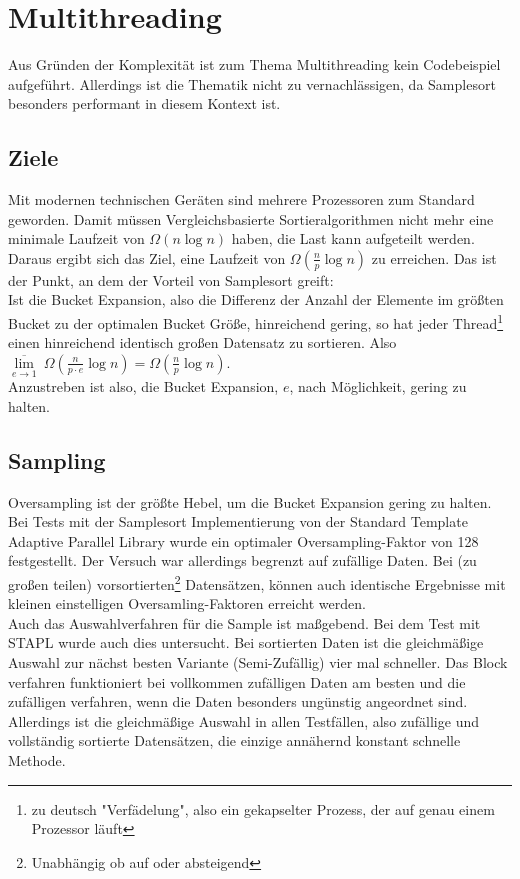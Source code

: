 \section{Multithreading}\label{sec:multithreading}
	Aus Gründen der Komplexität ist zum Thema Multithreading kein Codebeispiel aufgeführt.
	Allerdings ist die Thematik nicht zu vernachlässigen, da Samplesort besonders performant in diesem Kontext ist.
	
	\subsection{Ziele}
		Mit modernen technischen Geräten sind mehrere Prozessoren zum Standard geworden.
		Damit müssen Vergleichsbasierte Sortieralgorithmen nicht mehr eine minimale Laufzeit von $\Omega(n\log{n})$ haben, die Last kann aufgeteilt werden.
		Daraus ergibt sich das Ziel, eine Laufzeit von $\Omega\left(\frac{n}{p}\log{n}\right)$ zu erreichen.
		Das ist der Punkt, an dem der Vorteil von Samplesort greift:\\
		Ist die Bucket Expansion, also die Differenz der Anzahl der Elemente im größten Bucket zu der optimalen Bucket Größe, hinreichend gering, so hat jeder Thread\footnote{zu deutsch "Verfädelung", also ein gekapselter Prozess, der auf genau einem Prozessor läuft} einen hinreichend identisch großen Datensatz zu sortieren.
		Also $\underset{e\to 1}{\overline\lim}\ \Omega\left(\frac{n}{p\cdot e}\log{n}\right)=\Omega\left(\frac{n}{p}\log{n}\right)$.\\
		Anzustreben ist also, die Bucket Expansion, $e$, nach Möglichkeit, gering zu halten.
		
	\subsection{Sampling}
		Oversampling ist der größte Hebel, um die Bucket Expansion gering zu halten.
		Bei Tests mit der Samplesort Implementierung von der Standard Template Adaptive Parallel Library \autocite{berlin-2007} wurde ein optimaler Oversampling-Faktor von 128 festgestellt.
		Der Versuch war allerdings begrenzt auf zufällige Daten.
		Bei (zu großen teilen) vorsortierten\footnote{Unabhängig ob auf oder absteigend} Datensätzen, können auch identische Ergebnisse mit kleinen einstelligen Oversamling-Faktoren erreicht werden.\\
		Auch das Auswahlverfahren für die Sample ist maßgebend.
		Bei dem Test mit STAPL wurde auch dies untersucht.
		Bei sortierten Daten ist die gleichmäßige Auswahl zur nächst besten Variante (Semi-Zufällig) vier mal schneller.
		Das Block verfahren funktioniert bei vollkommen zufälligen Daten am besten und die zufälligen verfahren, wenn die Daten besonders ungünstig angeordnet sind.
		Allerdings ist die gleichmäßige Auswahl in allen Testfällen, also zufällige und vollständig sortierte Datensätzen, die einzige annähernd konstant schnelle Methode.
		
